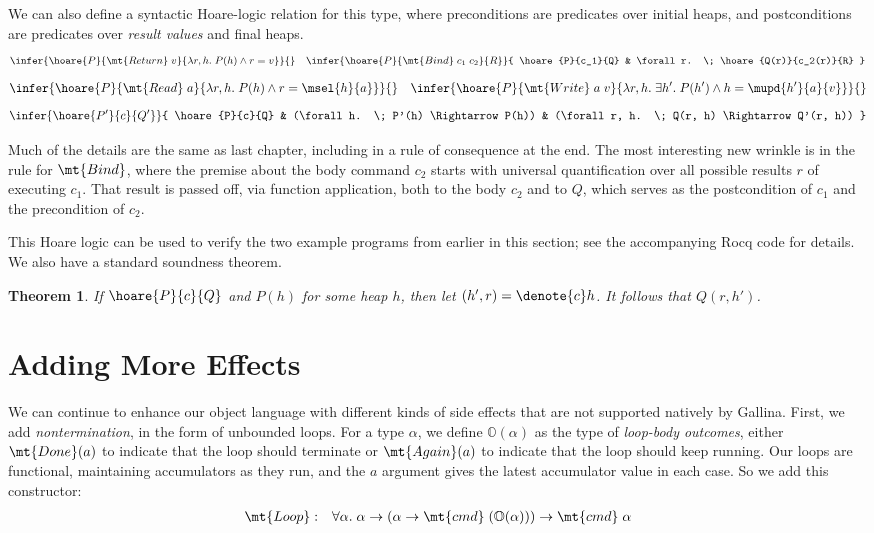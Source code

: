 \documentclass{amsbook}
\newtheorem{theorem}{Theorem}[chapter]
\theoremstyle{definition}
\theoremstyle{remark}
\numberwithin{section}{chapter}
\numberwithin{equation}{chapter}
\begin{document}
We can also define a syntactic Hoare-logic relation for this type, where preconditions are predicates over initial heaps, and postconditions are predicates over \emph{result values} and final heaps.
$$\infer{\hoare{P}{\mt{Return} \; v}{\lambda r, h. \; P(h) \land r = v}}{}
\quad \infer{\hoare{P}{\mt{Bind} \; c_1 \; c_2}{R}}{
  \hoare{P}{c_1}{Q}
  & \forall r. \; \hoare{Q(r)}{c_2(r)}{R}
}$$
$$\infer{\hoare{P}{\mt{Read} \; a}{\lambda r, h. \; P(h) \land r = \msel{h}{a}}}{}
\quad \infer{\hoare{P}{\mt{Write} \; a \; v}{\lambda r, h. \; \exists h'. \; P(h') \land h = \mupd{h'}{a}{v}}}{}$$
$$\infer{\hoare{P'}{c}{Q'}}{
  \hoare{P}{c}{Q}
  & (\forall h. \; P'(h) \Rightarrow P(h))
  & (\forall r, h. \; Q(r, h) \Rightarrow Q'(r, h))
}$$

Much of the details are the same as last chapter, including in a rule of consequence at the end.
The most interesting new wrinkle is in the rule for $\mt{Bind}$, where the premise about the body command $c_2$ starts with universal quantification over all possible results $r$ of executing $c_1$.
That result is passed off, via function application, both to the body $c_2$ and to $Q$, which serves as the postcondition of $c_1$ and the precondition of $c_2$.

This Hoare logic can be used to verify the two example programs from earlier in this section; see the accompanying Rocq code for details.
We also have a standard soundness theorem.
\begin{theorem}
  If $\hoare{P}{c}{Q}$ and $P(h)$ for some heap $h$, then let $(h', r) = \denote{c}h$.  It follows that $Q(r, h')$.
\end{theorem}


\section{Adding More Effects}

We can continue to enhance our object language with different kinds of side effects that are not supported natively by Gallina.
First, we add \emph{nontermination}, in the form of unbounded loops.
For a type $\alpha$, we define $\mathbb O(\alpha)$ as the type of \emph{loop-body outcomes}, either $\mt{Done}(a)$ to indicate that the loop should terminate or $\mt{Again}(a)$ to indicate that the loop should keep running.
Our loops are functional, maintaining accumulators as they run, and the $a$ argument gives the latest accumulator value in each case.
So we add this constructor:
\begin{eqnarray*}
  \mt{Loop} &:& \forall \alpha. \; \alpha \to (\alpha \to \mt{cmd} \; (\mathbb O(\alpha))) \to \mt{cmd} \; \alpha
\end{eqnarray*}
\end{document}
